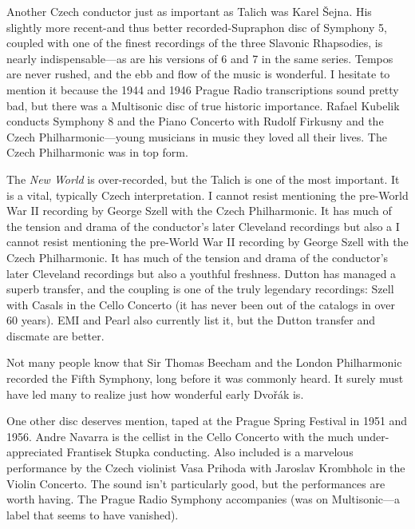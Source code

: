 \documentclass[12pt]{article}%
\begin{document}
Another Czech conductor just as important as Talich was Karel Šejna. His slightly more recent-and thus better recorded-Supraphon disc of Symphony 5, coupled with one of the finest recordings of the three Slavonic Rhapsodies, is nearly indispensable---as are his versions of 6 and 7 in the same series. Tempos are never rushed, and the ebb and flow of the music is wonderful.
I hesitate to mention it because the 1944 and 1946 Prague Radio transcriptions sound pretty bad, but there was a Multisonic disc of true historic importance. Rafael Kubelik conducts Symphony 8 and the Piano Concerto with Rudolf Firkusny and the Czech Philharmonic---young musicians in music they loved all their lives. The Czech Philharmonic was in top form.

The {\it New World} is over-recorded, but the Talich is one of the most important. It is a vital, typically Czech interpretation. I cannot resist mentioning the pre-World War II recording by George Szell with the Czech Philharmonic. It has much of the tension and drama of the conductor's later Cleveland recordings but also a
I cannot resist mentioning the pre-World War II recording by George Szell with the Czech Philharmonic. It has much of the tension and drama of the conductor's later Cleveland recordings but also a youthful freshness. Dutton has managed a superb transfer, and the coupling is one of the truly legendary recordings: Szell with Casals in the Cello Concerto (it has never been out of the catalogs in over 60 years). EMI and Pearl also currently list it, but the Dutton transfer and discmate are better.

Not many people know that Sir Thomas Beecham and the London Philharmonic recorded the Fifth Symphony, long before it was commonly heard. It surely must have led many to realize just how wonderful early Dvořák is.

One other disc deserves mention, taped at the Prague Spring Festival in 1951 and 1956.
Andre Navarra is the cellist in the Cello Concerto with the much under-appreciated Frantisek Stupka conducting. Also included is a marvelous performance by the Czech violinist Vasa Prihoda with Jaroslav Krombholc in the Violin Concerto. The sound isn't particularly good,
but the performances are worth having. The Prague Radio Symphony accompanies (was on Multisonic---a label that seems to have vanished).
\end{document}
